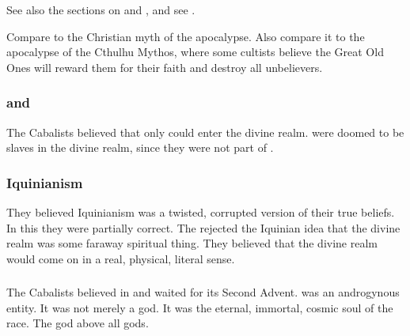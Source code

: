 See also the sections on  and , and see . 

Compare to the Christian myth of the apocalypse. 
Also compare it to the apocalypse of the Cthulhu Mythos, where some cultists believe the Great Old Ones will reward them for their faith and destroy all unbelievers. 






\subsubsection{\Humans and \scathae}
The Cabalists believed that only \humans could enter the divine realm. 
\Scathae were doomed to be slaves in the divine realm, since they were not part of \Lithrim. 





\subsubsection{Iquinianism}
They believed Iquinianism was a twisted, corrupted version of their true beliefs. 
In this they were partially correct.
The rejected the Iquinian idea that the divine realm was some faraway spiritual thing. 
They believed that the divine realm would come on \Miith in a real, physical, literal sense. 





\subsubsection{\Lithrim}
The Cabalists believed in \Lithrim and waited for its Second Advent. 
\Lithrim was an androgynous entity.
It was not merely a god.
It was the eternal, immortal, cosmic soul of the \human race.
The god above all gods. 









